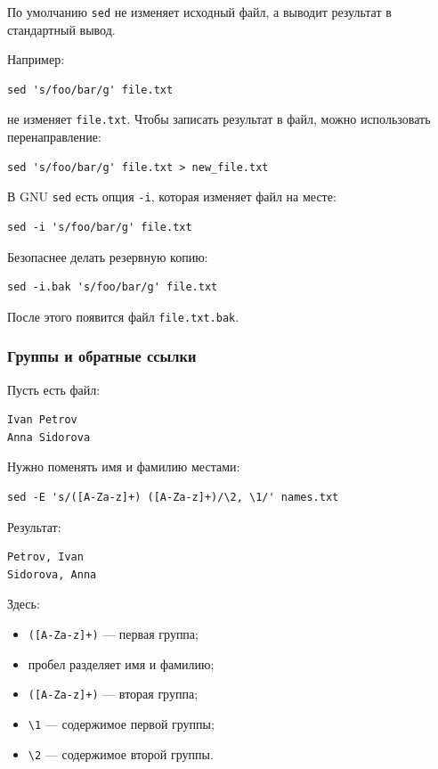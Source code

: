 \documentclass[12pt,a4paper]{article}
\begin{document}
По умолчанию \texttt{sed} не изменяет исходный файл, а выводит результат в стандартный вывод.

Например:

\begin{verbatim}
sed 's/foo/bar/g' file.txt
\end{verbatim}

не изменяет \texttt{file.txt}. Чтобы записать результат в файл, можно использовать перенаправление:

\begin{verbatim}
sed 's/foo/bar/g' file.txt > new_file.txt
\end{verbatim}

В GNU \texttt{sed} есть опция \texttt{-i}, которая изменяет файл на месте:

\begin{verbatim}
sed -i 's/foo/bar/g' file.txt
\end{verbatim}

Безопаснее делать резервную копию:

\begin{verbatim}
sed -i.bak 's/foo/bar/g' file.txt
\end{verbatim}

После этого появится файл \texttt{file.txt.bak}.

\subsubsection{Группы и обратные ссылки}

Пусть есть файл:

\begin{verbatim}
Ivan Petrov
Anna Sidorova
\end{verbatim}

Нужно поменять имя и фамилию местами:

\begin{verbatim}
sed -E 's/([A-Za-z]+) ([A-Za-z]+)/\2, \1/' names.txt
\end{verbatim}

Результат:

\begin{verbatim}
Petrov, Ivan
Sidorova, Anna
\end{verbatim}

Здесь:

\begin{itemize}
    \item \texttt{([A-Za-z]+)} --- первая группа;
    \item пробел разделяет имя и фамилию;
    \item \texttt{([A-Za-z]+)} --- вторая группа;
    \item \texttt{\textbackslash 1} --- содержимое первой группы;
    \item \texttt{\textbackslash 2} --- содержимое второй группы.
\end{itemize}
\end{document}

